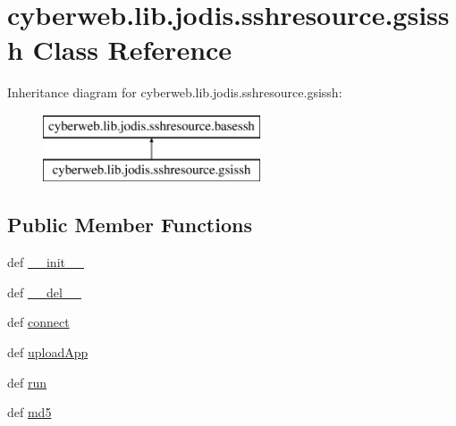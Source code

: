 \hypertarget{classcyberweb_1_1lib_1_1jodis_1_1sshresource_1_1gsissh}{\section{cyberweb.\-lib.\-jodis.\-sshresource.\-gsissh \-Class \-Reference}
\label{classcyberweb_1_1lib_1_1jodis_1_1sshresource_1_1gsissh}
}
\-Inheritance diagram for cyberweb.\-lib.\-jodis.\-sshresource.\-gsissh\-:\begin{figure}[H]
\begin{center}
\leavevmode
\includegraphics[height=2.000000cm]{classcyberweb_1_1lib_1_1jodis_1_1sshresource_1_1gsissh}
\end{center}
\end{figure}
\subsection*{\-Public \-Member \-Functions}
\begin{DoxyCompactItemize}
\item 
def \hyperlink{classcyberweb_1_1lib_1_1jodis_1_1sshresource_1_1gsissh_af9e3c85c3ed32b31a1a620df1c665528}{\-\_\-\-\_\-init\-\_\-\-\_\-}
\item 
def \hyperlink{classcyberweb_1_1lib_1_1jodis_1_1sshresource_1_1gsissh_a38f53f5666a2cf8c21f8c53b48adfe1b}{\-\_\-\-\_\-del\-\_\-\-\_\-}
\item 
def \hyperlink{classcyberweb_1_1lib_1_1jodis_1_1sshresource_1_1gsissh_ab1019caabbdedc84904cb45cec195a37}{connect}
\item 
def \hyperlink{classcyberweb_1_1lib_1_1jodis_1_1sshresource_1_1gsissh_a83729346b2a683de4cbe0744d230607f}{upload\-App}
\item 
def \hyperlink{classcyberweb_1_1lib_1_1jodis_1_1sshresource_1_1gsissh_a85f5cb37399a94447aa0b858dd69a7ee}{run}
\item 
def \hyperlink{classcyberweb_1_1lib_1_1jodis_1_1sshresource_1_1gsissh_a119b7e744196814e3d71e8e5c5283989}{md5}
\end{DoxyCompactItemize}
